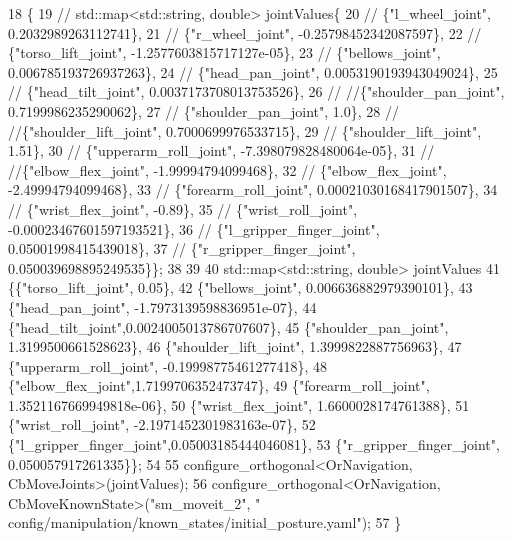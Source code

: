 \begin{DoxyCode}
18     \{
19         \textcolor{comment}{// std::map<std::string, double> jointValues\{}
20         \textcolor{comment}{//     \{"l\_wheel\_joint", 0.2032989263112741\},}
21         \textcolor{comment}{//     \{"r\_wheel\_joint", -0.25798452342087597\},}
22         \textcolor{comment}{//     \{"torso\_lift\_joint", -1.2577603815717127e-05\},}
23         \textcolor{comment}{//     \{"bellows\_joint", 0.006785193726937263\},}
24         \textcolor{comment}{//     \{"head\_pan\_joint", 0.0053190193943049024\},}
25         \textcolor{comment}{//     \{"head\_tilt\_joint", 0.0037173708013753526\},}
26         \textcolor{comment}{//     //\{"shoulder\_pan\_joint", 0.7199986235290062\},}
27         \textcolor{comment}{//     \{"shoulder\_pan\_joint", 1.0\},}
28         \textcolor{comment}{//     //\{"shoulder\_lift\_joint", 0.7000699976533715\},}
29         \textcolor{comment}{//     \{"shoulder\_lift\_joint", 1.51\},}
30         \textcolor{comment}{//     \{"upperarm\_roll\_joint", -7.398079828480064e-05\},}
31         \textcolor{comment}{//     //\{"elbow\_flex\_joint", -1.99994794099468\},}
32         \textcolor{comment}{//     \{"elbow\_flex\_joint", -2.49994794099468\},}
33         \textcolor{comment}{//     \{"forearm\_roll\_joint", 0.00021030168417901507\},}
34         \textcolor{comment}{//     \{"wrist\_flex\_joint", -0.89\},}
35         \textcolor{comment}{//     \{"wrist\_roll\_joint", -0.00023467601597193521\},}
36         \textcolor{comment}{//     \{"l\_gripper\_finger\_joint", 0.05001998415439018\},}
37         \textcolor{comment}{//     \{"r\_gripper\_finger\_joint", 0.050039698895249535\}\};}
38 
39 
40     std::map<std::string, double> jointValues
41        \{\{\textcolor{stringliteral}{"torso\_lift\_joint"}, 0.05\},
42         \{\textcolor{stringliteral}{"bellows\_joint"}, 0.006636882979390101\},
43         \{\textcolor{stringliteral}{"head\_pan\_joint"}, -1.7973139598836951e-07\},
44         \{\textcolor{stringliteral}{"head\_tilt\_joint"},0.0024005013786707607\},
45         \{\textcolor{stringliteral}{"shoulder\_pan\_joint"}, 1.3199500661528623\},
46         \{\textcolor{stringliteral}{"shoulder\_lift\_joint"}, 1.3999822887756963\},
47         \{\textcolor{stringliteral}{"upperarm\_roll\_joint"}, -0.19998775461277418\},
48         \{\textcolor{stringliteral}{"elbow\_flex\_joint"},1.7199706352473747\},
49         \{\textcolor{stringliteral}{"forearm\_roll\_joint"}, 1.3521167669949818e-06\},
50         \{\textcolor{stringliteral}{"wrist\_flex\_joint"}, 1.6600028174761388\},
51         \{\textcolor{stringliteral}{"wrist\_roll\_joint"}, -2.1971452301983163e-07\},
52         \{\textcolor{stringliteral}{"l\_gripper\_finger\_joint"},0.05003185444046081\},
53         \{\textcolor{stringliteral}{"r\_gripper\_finger\_joint"}, 0.050057917261335\}\};
54 
55         configure\_orthogonal<OrNavigation, CbMoveJoints>(jointValues);
56         configure\_orthogonal<OrNavigation, CbMoveKnownState>(\textcolor{stringliteral}{"sm\_moveit\_2"}, \textcolor{stringliteral}{"
      config/manipulation/known\_states/initial\_posture.yaml"});
57     \}
\end{DoxyCode}


